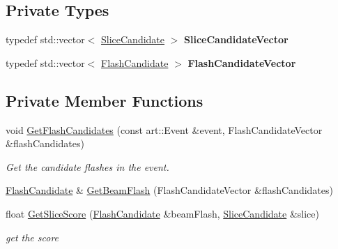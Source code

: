 \subsection*{Private Types}
\begin{DoxyCompactItemize}
\item 
typedef std\+::vector$<$ \hyperlink{classflashmatch_1_1FlashMatchingTool_1_1SliceCandidate}{Slice\+Candidate} $>$ {\bfseries Slice\+Candidate\+Vector}\hypertarget{classflashmatch_1_1FlashMatchingTool_a6a9ab4e3315550624ddc72103c2d260c}{}\label{classflashmatch_1_1FlashMatchingTool_a6a9ab4e3315550624ddc72103c2d260c}

\item 
typedef std\+::vector$<$ \hyperlink{classflashmatch_1_1FlashMatchingTool_1_1FlashCandidate}{Flash\+Candidate} $>$ {\bfseries Flash\+Candidate\+Vector}\hypertarget{classflashmatch_1_1FlashMatchingTool_ae4ca02d264c29ff19c6d32627c4bf852}{}\label{classflashmatch_1_1FlashMatchingTool_ae4ca02d264c29ff19c6d32627c4bf852}

\end{DoxyCompactItemize}
\subsection*{Private Member Functions}
\begin{DoxyCompactItemize}
\item 
void \hyperlink{classflashmatch_1_1FlashMatchingTool_a68229bfc94d94e91513fefe60a3b43d6}{Get\+Flash\+Candidates} (const art\+::\+Event \&event, Flash\+Candidate\+Vector \&flash\+Candidates)
\begin{DoxyCompactList}\small\item\em Get the candidate flashes in the event. \end{DoxyCompactList}\item 
\hyperlink{classflashmatch_1_1FlashMatchingTool_1_1FlashCandidate}{Flash\+Candidate} \& \hyperlink{classflashmatch_1_1FlashMatchingTool_a55eb0441a37240344fc893857aabda28}{Get\+Beam\+Flash} (Flash\+Candidate\+Vector \&flash\+Candidates)
\item 
float \hyperlink{classflashmatch_1_1FlashMatchingTool_a64dcefa0f3f8e95d51dcb0aadbc711c8}{Get\+Slice\+Score} (\hyperlink{classflashmatch_1_1FlashMatchingTool_1_1FlashCandidate}{Flash\+Candidate} \&beam\+Flash, \hyperlink{classflashmatch_1_1FlashMatchingTool_1_1SliceCandidate}{Slice\+Candidate} \&slice)
\begin{DoxyCompactList}\small\item\em get the score \end{DoxyCompactList}\end{DoxyCompactItemize}
